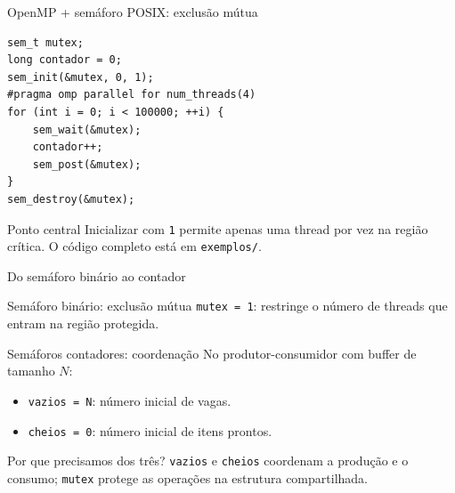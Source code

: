 \documentclass[aspectratio=169,11pt]{beamer}
\begin{document}
\begin{frame}[fragile]{OpenMP + semáforo POSIX: exclusão mútua}
\small
\begin{verbatim}
sem_t mutex;
long contador = 0;
sem_init(&mutex, 0, 1);
#pragma omp parallel for num_threads(4)
for (int i = 0; i < 100000; ++i) {
    sem_wait(&mutex);
    contador++;
    sem_post(&mutex);
}
sem_destroy(&mutex);
\end{verbatim}
\vspace{0.1cm}
\begin{block}{Ponto central}
Inicializar com \texttt{1} permite apenas uma thread por vez na região crítica. O código completo está em \texttt{exemplos/}.
\end{block}
\end{frame}

\begin{frame}{Do semáforo binário ao contador}
\begin{block}{Semáforo binário: exclusão mútua}
\texttt{mutex = 1}: restringe o número de threads que entram na região protegida.
\end{block}
\begin{block}{Semáforos contadores: coordenação}
No produtor-consumidor com buffer de tamanho $N$:
\begin{itemize}
\item \texttt{vazios = N}: número inicial de vagas.
\item \texttt{cheios = 0}: número inicial de itens prontos.
\end{itemize}
\end{block}
\begin{alertblock}{Por que precisamos dos três?}
\texttt{vazios} e \texttt{cheios} coordenam a produção e o consumo; \texttt{mutex} protege as operações na estrutura compartilhada.
\end{alertblock}
\end{frame}
\end{document}
